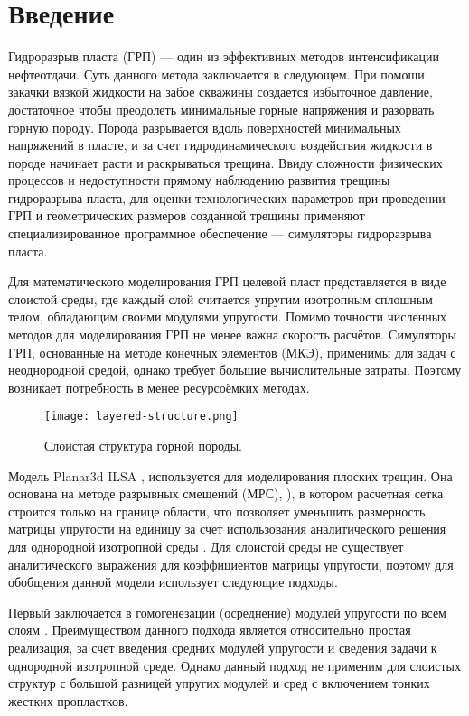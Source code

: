 \chapter*{Введение}                         %

Гидроразрыв пласта (ГРП) — один из эффективных методов интенсификации нефтеотдачи. Суть данного метода заключается в следующем. При помощи закачки вязкой жидкости на забое скважины создается избыточное давление, достаточное чтобы преодолеть минимальные горные напряжения и разорвать горную породу. Порода разрывается вдоль поверхностей минимальных напряжений в пласте, и за счет гидродинамического воздействия жидкости в породе начинает расти и раскрываться трещина. Ввиду сложности физических процессов и недоступности прямому наблюдению развития трещины гидроразрыва пласта, для оценки технологических параметров при проведении ГРП и геометрических размеров созданной трещины применяют специализированное программное обеспечение — симуляторы гидроразрыва пласта.

Для математического моделирования ГРП целевой пласт представляется в виде слоистой среды, где каждый слой считается упругим изотропным сплошным телом, обладающим своими модулями упругости. Помимо точности численных методов для моделирования ГРП не менее важна скорость расчётов. Симуляторы ГРП, основанные на методе конечных элементов (МКЭ), применимы для задач с неоднородной средой, однако требует большие вычислительные затраты. Поэтому возникает потребность в менее ресурсоёмких методах.

\begin{figure}[htbp]
    \centering
    \texttt{[image: layered-structure.png]}
    \caption{Слоистая структура горной породы.}
\end{figure}

Модель Planar3d ILSA \cite{DONTSOV201753}, используется для моделирования плоских трещин. Она основана на методе разрывных смещений (МРС), \cite{dispalecement_discontinuty_Crouch1983}), в котором расчетная сетка строится только на границе области, что позволяет уменьшить размерность матрицы упругости на единицу за счет использования аналитического решения для однородной изотропной среды \cite{Peir2008}. Для слоистой среды не существует аналитического выражения для коэффициентов матрицы упругости, поэтому для обобщения данной модели использует следующие подходы.

Первый заключается в гомогенезации (осреднение) модулей упругости по всем слоям \cite{DONTSOV2021108144}. Преимуществом данного подхода является относительно простая реализация, за счет введения средних модулей упругости и сведения задачи к однородной изотропной среде. Однако данный подход не применим для слоистых структур с большой разницей упругих модулей и сред с включением тонких жестких пропластков.

